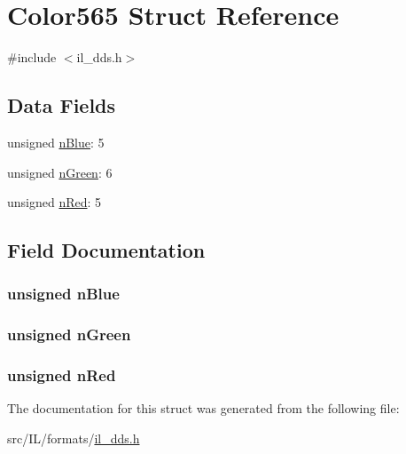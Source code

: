 \hypertarget{struct_color565}{\section{Color565 Struct Reference}
\label{struct_color565}
}


{\ttfamily \#include $<$il\-\_\-dds.\-h$>$}

\subsection*{Data Fields}
\begin{DoxyCompactItemize}
\item 
unsigned \hyperlink{struct_color565_ae06d8ce2a8dd77049b7d2fc11ada7788}{n\-Blue}\-: 5
\item 
unsigned \hyperlink{struct_color565_ac8cdadbe8f3a595ba50d2815d1436f8a}{n\-Green}\-: 6
\item 
unsigned \hyperlink{struct_color565_a9be0162cd913c878c08b8118f8c4e11d}{n\-Red}\-: 5
\end{DoxyCompactItemize}


\subsection{Field Documentation}
\hypertarget{struct_color565_ae06d8ce2a8dd77049b7d2fc11ada7788}{
\subsubsection[{n\-Blue}]{\setlength{\rightskip}{0pt plus 5cm}unsigned n\-Blue}}\label{struct_color565_ae06d8ce2a8dd77049b7d2fc11ada7788}
\hypertarget{struct_color565_ac8cdadbe8f3a595ba50d2815d1436f8a}{
\subsubsection[{n\-Green}]{\setlength{\rightskip}{0pt plus 5cm}unsigned n\-Green}}\label{struct_color565_ac8cdadbe8f3a595ba50d2815d1436f8a}
\hypertarget{struct_color565_a9be0162cd913c878c08b8118f8c4e11d}{
\subsubsection[{n\-Red}]{\setlength{\rightskip}{0pt plus 5cm}unsigned n\-Red}}\label{struct_color565_a9be0162cd913c878c08b8118f8c4e11d}


The documentation for this struct was generated from the following file\-:\begin{DoxyCompactItemize}
\item 
src/\-I\-L/formats/\hyperlink{il__dds_8h}{il\-\_\-dds.\-h}\end{DoxyCompactItemize}
